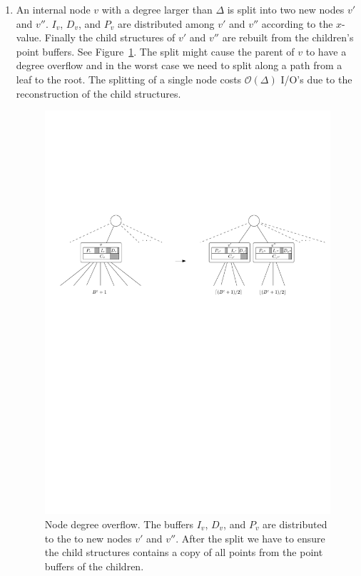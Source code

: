 \documentclass[twoside,11pt,openright]{report}
\begin{document}
\begin{enumerate}[label=(\roman*)]
	\item\label{update:deg} An internal node $v$ with a degree larger than $\Delta$ is split into two new nodes $v'$ and $v''$. $I_v$, $D_v$, and $P_v$ are distributed among $v'$ and $v''$ according to the $x$-value. Finally the child structures of $v'$ and $v''$ are rebuilt from the children's point buffers. See Figure~\ref{fig:brodal_node_degree_overflow}. The split might cause the parent of $v$ to have a degree overflow and in the worst case we need to split along a path from a leaf to the root. The splitting of a single node costs $\mathcal{O}(\Delta)$ I/O's due to the reconstruction of the child structures.
	
	
	\begin{figure}[h]
		\centering
		\includegraphics[width=1\textwidth]{../figures/brodal_node_degree_overflow}
		\caption{Node degree overflow. The buffers $I_v$, $D_v$, and $P_v$ are distributed to the to new nodes $v'$ and $v''$. After the split we have to ensure the child structures contains a copy of all points from the point buffers of the children.}
		\label{fig:brodal_node_degree_overflow}
	\end{figure}		
	

\end{enumerate}
\end{document}
